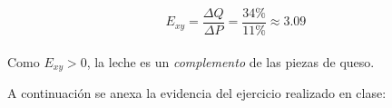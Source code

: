 \documentclass[a4paper,12pt]{article}
\begin{document}
\begin{enumerate}
	\[E_{xy} = \frac{\Delta Q}{\Delta P} = \frac{34\%}{11\%} \approx 3.09 \] \\

	Como $E_{xy} > 0$, la leche es un \emph{complemento} de las piezas de queso.
\end{enumerate}

\vspace{1cm}

A continuación se anexa la evidencia del ejercicio realizado en clase:

\vspace{1cm}
\end{document}
